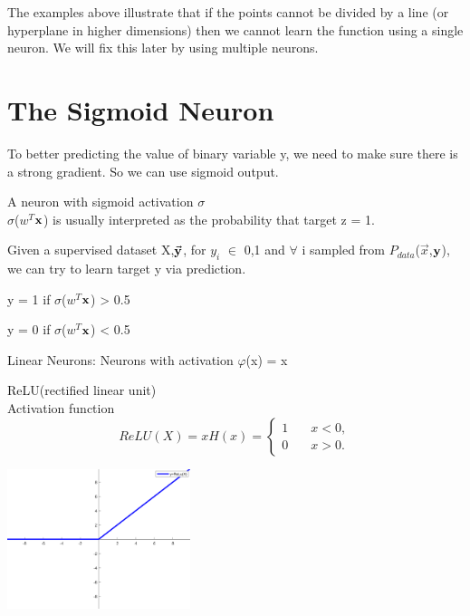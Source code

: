The examples above illustrate that if the points cannot be divided by a line (or hyperplane in higher dimensions) then we cannot learn the function using a single neuron. We will fix this later by using multiple neurons.

\section{The Sigmoid Neuron}

To better predicting the value of binary variable y, we need to make sure there is a strong gradient. So we can use sigmoid output.

\begin{definition}
    A neuron with sigmoid activation $\sigma$ \\
    $\sigma$($w^T$$\vx$) is usually interpreted as the probability that target z = 1.
\end{definition}

Given a supervised dataset X,$\Vec{\vy}$, for $y_i$ $\in$ {0,1} and $\forall$ i sampled from $P_{data}$($\Vec{x}$,$\vy$), we can try to learn target y via prediction.\\

\centerline {y = 1 if $\sigma$($w^T$$\vx$) > 0.5} 
\centerline {y = 0 if $\sigma$($w^T$$\vx$) < 0.5}

Linear Neurons: Neurons with activation $\varphi$(x) = x

\begin{definition}
    ReLU(rectified linear unit)\\
    Activation function
    \begin{equation*}
        ReLU(X) = xH(x) = \begin{cases}
        1 & \quad x < 0, \\
        0 & \quad x > 0.
        \end{cases}
    \end{equation*}
\end{definition}

\begin{center}
    \includegraphics[width=2.1in]{images/Chapter 10/ReLU.png}
\end{center}


